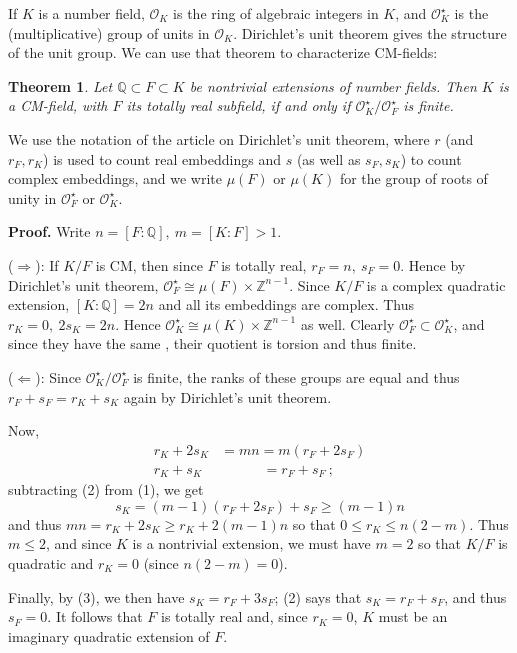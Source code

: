 \documentclass[12pt]{article}
\newtheorem{thm}{Theorem}
\newcommand{\Alg}{\mathcal{O}}
\newcommand{\UK}{\Alg_K^{\star}}
\newcommand{\UF}{\Alg_F^{\star}}
\newcommand{\Rats}{\mathbb{Q}}
\newcommand{\Ints}{\mathbb{Z}}
\begin{document}
If $K$ is a number field, $\Alg_K$ is the ring of algebraic integers in $K$, and $\UK$ is the (multiplicative) group of units in $\Alg_K$. Dirichlet's unit theorem gives the structure of the unit group. We can use that theorem to characterize CM-fields:

\begin{thm} Let $\Rats\subset F\subset K$ be nontrivial extensions of number fields. Then $K$ is a CM-field, with $F$ its totally real subfield, if and only if $\UK/\UF$ is finite.
\end{thm}

We use the notation of the article on Dirichlet's unit theorem, where $r$ (and $r_F, r_K$) is used to count real embeddings and $s$ (as well as $s_F, s_K$) to count complex embeddings, and we write $\mu(F)$ or $\mu(K)$ for the group of roots of unity in $\UF$ or $\UK$.

\textbf{Proof. }
\newline
Write $n=[F:\Rats],\ m=[K:F]>1$.

($\Rightarrow$): If $K/F$ is CM, then since $F$ is totally real, $r_F = n,\  s_F = 0$. Hence by Dirichlet's unit theorem, $\UF\cong \mu(F)\times \Ints^{n-1}$. Since $K/F$ is a complex quadratic extension, $[K:\Rats]=2n$ and all its embeddings are complex. Thus $r_K=0,\  2s_K = 2n$. Hence $\UK \cong \mu(K) \times \Ints^{n-1}$ as well. Clearly $\UF\subset \UK$, and since they have the same , their quotient is torsion and thus finite.

($\Leftarrow$): Since $\UK/\UF$ is finite, the ranks of these groups are equal and thus $r_F+s_F=r_K+s_K$ again by Dirichlet's unit theorem.

Now,
\begin{align}
r_K+2s_K&=mn=m(r_F+2s_F)\\
r_K+s_K&\phantom{=mn\ }=r_F+s_F\ ;
\end{align}
subtracting (2) from (1), we get
\begin{equation}s_K = (m-1)(r_F+2s_F)+s_F \geq (m-1)n\end{equation}
and thus $mn = r_K+2s_K \geq r_K+2(m-1)n$ so that $0\leq r_K\leq n(2-m)$. Thus $m\leq 2$, and since $K$ is a nontrivial extension, we must have $m=2$ so that $K/F$ is quadratic and $r_K=0$ (since $n(2-m)=0$).

Finally, by (3), we then have $s_K = r_F+3s_F$; (2) says that $s_K = r_F+s_F$, and thus $s_F=0$. It follows that $F$ is totally real and, since $r_K=0$, $K$ must be an imaginary quadratic extension of $F$.
\end{document}

